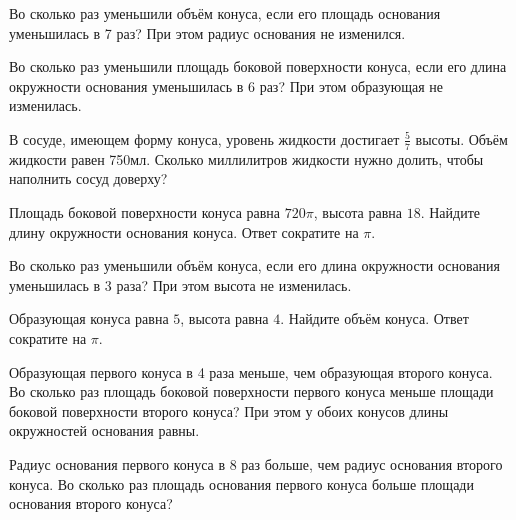 \documentclass[a4paper]{article}
\begin{document}
\begin{taskBN}{30}
Во сколько раз уменьшили объём конуса, если его площадь основания уменьшилась в 7 раз? При этом радиус основания не изменился.
\end{taskBN}

\begin{taskBN}{31}
Во сколько раз уменьшили площадь боковой поверхности конуса, если его длина окружности основания уменьшилась в 6 раз? При этом образующая не изменилась.
\end{taskBN}

\begin{taskBN}{32}
В сосуде, имеющем форму конуса, уровень жидкости достигает $\frac{5}{7}$ высоты. Объём жидкости равен 750мл. Сколько миллилитров жидкости нужно долить, чтобы наполнить сосуд доверху?
\end{taskBN}

\begin{taskBN}{33}
Площадь боковой поверхности конуса равна $720\pi$, высота равна $18$. Найдите длину окружности основания конуса. Ответ сократите на $\pi$.
\end{taskBN}

\begin{taskBN}{34}
Во сколько раз уменьшили объём конуса, если его длина окружности основания уменьшилась в 3 раза? При этом высота не изменилась.
\end{taskBN}

\begin{taskBN}{35}
Образующая конуса равна $5$, высота равна $4$. Найдите объём конуса. Ответ сократите на $\pi$.
\end{taskBN}

\begin{taskBN}{36}
Образующая первого конуса в 4 раза меньше, чем образующая второго конуса. Во сколько раз площадь боковой поверхности первого конуса меньше площади боковой поверхности второго конуса? При этом у обоих конусов длины окружностей основания равны.
\end{taskBN}

\begin{taskBN}{37}
Радиус основания первого конуса в 8 раз больше, чем радиус основания второго конуса. Во сколько раз площадь основания первого конуса больше площади основания второго конуса?
\end{taskBN}
\end{document}
